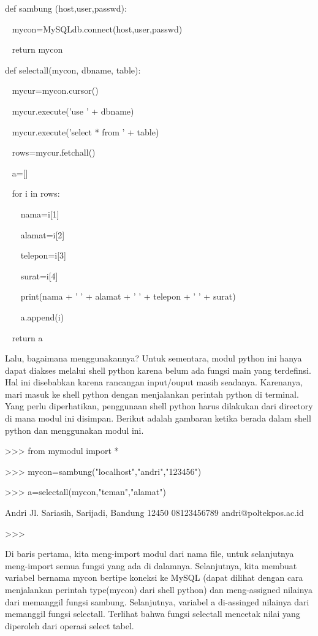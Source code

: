 \documentclass{wileySix}
\begin{document}
\noindent 
def sambung (host,user,passwd): \par
\noindent 
~ mycon=MySQLdb.connect(host,user,passwd) \par
\noindent 
~ return mycon \par
\vspace{12pt}
\noindent 
def selectall(mycon, dbname, table): \par
\noindent 
~ mycur=mycon.cursor() \par
\noindent 
~ mycur.execute('use ' + dbname) \par
\noindent 
~ mycur.execute('select * from ' + table) \par
\noindent 
~ rows=mycur.fetchall() \par
\noindent 
~ a=[] \par
\noindent 
~ for i in rows: \par
\noindent 
~~~ nama=i[1] \par
\noindent 
~~~ alamat=i[2] \par
\noindent 
~~~ telepon=i[3] \par
\noindent 
~~~ surat=i[4] \par
\noindent 
~~~ print(nama + ' ' + alamat + ' ' + telepon + ' ' + surat) \par
\noindent 
~~~ a.append(i) \par
\noindent 
~ return a \par
Lalu, bagaimana menggunakannya? Untuk sementara, modul python ini hanya dapat diakses melalui shell python karena belum ada fungsi main yang terdefinsi. Hal ini disebabkan karena rancangan input/ouput masih seadanya. Karenanya, mari masuk ke shell python dengan menjalankan perintah python di terminal. Yang perlu diperhatikan, penggunaan shell python harus dilakukan dari directory di mana modul ini disimpan. Berikut adalah gambaran ketika berada dalam shell python dan menggunakan modul ini. \par
\noindent 
>>> from mymodul import * \par
\noindent 
>>> mycon=sambung("localhost","andri","123456") \par
\noindent 
>>> a=selectall(mycon,"teman","alamat") \par
\noindent 
Andri Jl. Sariasih, Sarijadi, Bandung 12450 08123456789 andri@poltekpos.ac.id \par
\noindent 
>>> \par
Di baris pertama, kita meng-import modul dari nama file, untuk selanjutnya meng-import semua fungsi yang ada di dalamnya. Selanjutnya, kita membuat variabel bernama mycon bertipe koneksi ke MySQL (dapat dilihat dengan cara menjalankan perintah type(mycon) dari shell python) dan meng-assigned nilainya dari memanggil fungsi sambung. Selanjutnya, variabel a di-assinged nilainya dari memanggil fungsi selectall. Terlihat bahwa fungsi selectall mencetak nilai yang diperoleh dari operasi select tabel. \par
\end{document}
